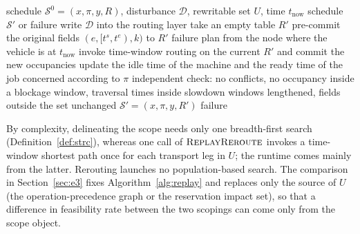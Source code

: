 \documentclass[manuscript,screen,review]{acmart}
\begin{document}
\begin{algorithm}[t]
\caption{Single-pass rerouting \(\textsc{ReplayReroute}\)}
\label{alg:replay}
\begin{algorithmic}[1]
\Require schedule \(\mathcal{S}^0=(x,\pi,y,R)\), disturbance \(\mathcal{D}\), rewritable set \(U\), time \(t_{\mathrm{now}}\)
\Ensure schedule \(\mathcal{S}'\) or failure
\State write \(\mathcal{D}\) into the routing layer
\State take an empty table \(R'\)
  \State pre-commit the original fields \((e,[t^s,t^e),k)\) to \(R'\)
    \State \Return failure
  \EndIf
\EndFor
{}
  \State plan from the node where the vehicle is at \(t_{\mathrm{now}}\) 
  \State invoke time-window routing on the current \(R'\) and commit the new occupancies
  \State update the idle time of the machine and the ready time of the job concerned according to \(\pi\)
\EndFor
\State independent check: no conflicts, no occupancy inside a blockage window, traversal times inside slowdown windows lengthened, fields outside the set unchanged
  \State \Return \(\mathcal{S}'=(x,\pi,y,R')\)
\Else
  \State \Return failure
\EndIf
\end{algorithmic}
\end{algorithm}

By complexity, delineating the scope needs only one breadth-first search (Definition~\ref{def:strc}), whereas one call of
\(\textsc{ReplayReroute}\) invokes a time-window shortest path once for each transport leg in \(U\); the runtime comes mainly from the latter.
Rerouting launches no population-based search. The comparison in Section~\ref{sec:e3} fixes Algorithm~\ref{alg:replay} and replaces only the source of \(U\)
(the operation-precedence graph or the reservation impact set), so that a difference in feasibility rate between the two scopings can come only from the scope object.
\end{document}
